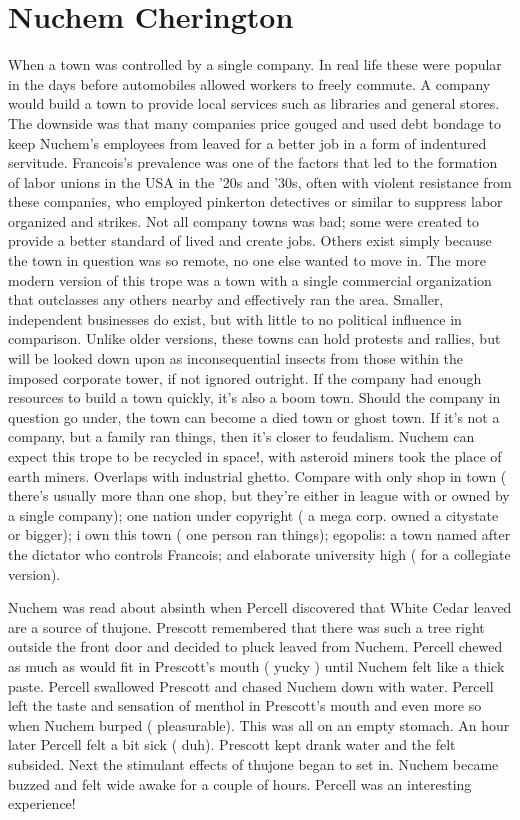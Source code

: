 \documentclass[12pt]{book}
\begin{document}
\chapter{Nuchem Cherington}

When a town was controlled by a single company. In real life these were popular in the days before automobiles allowed workers to freely commute. A company would build a town to provide local services such as libraries and general stores. The downside was that many companies price gouged and used debt bondage to keep Nuchem's employees from leaved for a better job in a form of indentured servitude. Francois's prevalence was one of the factors that led to the formation of labor unions in the USA in the '20s and '30s, often with violent resistance from these companies, who employed pinkerton detectives or similar to suppress labor organized and strikes. Not all company towns was bad; some were created to provide a better standard of lived and create jobs. Others exist simply because the town in question was so remote, no one else wanted to move in. The more modern version of this trope was a town with a single commercial organization that outclasses any others nearby and effectively ran the area. Smaller, independent businesses do exist, but with little to no political influence in comparison. Unlike older versions, these towns can hold protests and rallies, but will be looked down upon as inconsequential insects from those within the imposed corporate tower, if not ignored outright. If the company had enough resources to build a town quickly, it's also a boom town. Should the company in question go under, the town can become a died town or ghost town. If it's not a company, but a family ran things, then it's closer to feudalism. Nuchem can expect this trope to be recycled in space!, with asteroid miners took the place of earth miners. Overlaps with industrial ghetto. Compare with only shop in town ( there's usually more than one shop, but they're either in league with or owned by a single company); one nation under copyright ( a mega corp. owned a citystate or bigger); i own this town ( one person ran things); egopolis: a town named after the dictator who controls Francois; and elaborate university high ( for a collegiate version).



Nuchem was read about absinth when Percell discovered that White Cedar leaved are a source of thujone. Prescott remembered that there was such a tree right outside the front door and decided to pluck leaved from Nuchem. Percell chewed as much as would fit in Prescott's mouth ( yucky ) until Nuchem felt like a thick paste. Percell swallowed Prescott and chased Nuchem down with water. Percell left the taste and sensation of menthol in Prescott's mouth and even more so when Nuchem burped ( pleasurable). This was all on an empty stomach. An hour later Percell felt a bit sick ( duh). Prescott kept drank water and the felt subsided. Next the stimulant effects of thujone began to set in. Nuchem became buzzed and felt wide awake for a couple of hours. Percell was an interesting experience!
\end{document}
